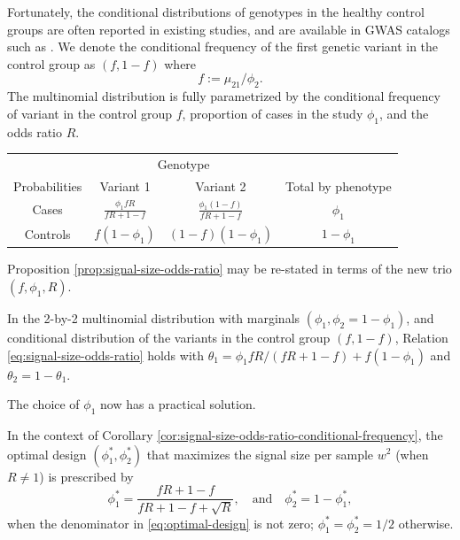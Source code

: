 Fortunately, the conditional distributions of genotypes in the healthy control groups are often reported in existing studies, and are available in GWAS catalogs such as \cite{macarthur2016new}.
We denote the conditional frequency of the first genetic variant in the control group as $(f, 1-f)$ where
$$
f := \mu_{21} / \phi_2.
$$
The multinomial distribution is fully parametrized by the conditional frequency of variant in the control group $f$, proportion of cases in the study $\phi_1$, and the odds ratio $R$.
\begin{center}
    \begin{tabular}{cccc}
    \hline
    & \multicolumn{2}{c}{Genotype} \\
    \cline{2-3}
    Probabilities & Variant 1 & Variant 2 & Total by phenotype \\
    \hline
    Cases & $\frac{\phi_1fR}{fR+1-f}$ & $\frac{\phi_1(1-f)}{fR+1-f}$ & $\phi_1$ \\
    Controls & $f(1-\phi_1)$ & $(1-f)(1-\phi_1)$ & $1-\phi_1$ \\
    \hline
    \end{tabular}
\end{center}
Proposition \ref{prop:signal-size-odds-ratio} may be re-stated in terms of the new trio $(f, \phi_1, R)$.


\begin{corollary} \label{cor:signal-size-odds-ratio-conditional-frequency}
In the 2-by-2 multinomial distribution with marginals $(\phi_1, \phi_2 = 1-\phi_1)$, and conditional distribution of the variants in the control group $(f, 1-f)$,
Relation \eqref{eq:signal-size-odds-ratio} holds with $\theta_1 = {\phi_1fR}/{(fR+1-f)} + f(1-\phi_1)$ and $\theta_2 = 1-\theta_1$.
\end{corollary} 

The choice of $\phi_1$ now has a practical solution.

\begin{corollary} \label{cor:optimal-design}
In the context of Corollary \ref{cor:signal-size-odds-ratio-conditional-frequency},
the optimal design $(\phi^*_1, \phi^*_2)$ that maximizes the signal size per sample $w^2$ (when $R\neq1$) is prescribed by
\begin{equation} \label{eq:optimal-design}
    \phi_1^* = \frac{fR+1-f}{fR+1-f+\sqrt{R}}, \quad\text{and}\quad 
    \phi_2^* = 1-\phi_1^*,
\end{equation}
when the denominator in \eqref{eq:optimal-design} is not zero; $\phi_1^*=\phi_2^*=1/2$ otherwise.
\end{corollary} 

